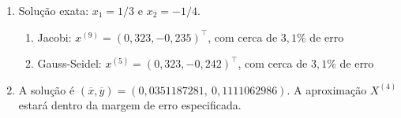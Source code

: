 \documentclass[12pt,a4paper]{article}
\begin{document}
\begin{enumerate}
\item Solução exata: $x_1 = 1/3$ e $x_2 = -1/4$.
\begin{enumerate}
\item Jacobi: $x^{(9)} = (0,323, -0,235)^\intercal$, com cerca de $3,1\%$ de erro
\item Gauss-Seidel: $x^{(5)} = (0,323, -0,242)^\intercal$, com cerca de $3,1\%$ de erro
\end{enumerate}


\item A solução é $(\overline{x},\overline{y}) = (0,0351187281,\ 0,1111062986)$. A aproximação $X^{(4)}$ estará dentro da margem de erro especificada.
\end{enumerate}
\end{document}
